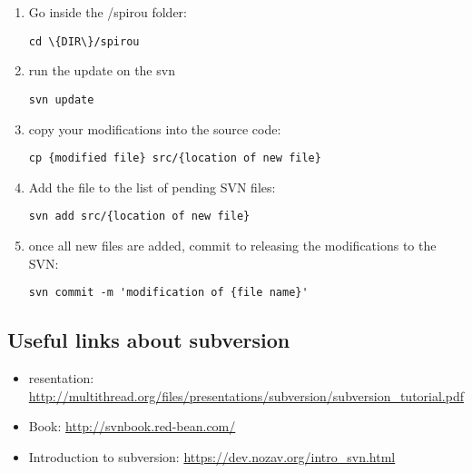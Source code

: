 \begin{enumerate}
\item Go inside the /spirou folder:
\begin{lstlisting}[style=bashstyle]
cd \{DIR\}/spirou
\end{lstlisting}

\item run the update on the svn
\begin{lstlisting}[style=bashstyle]
svn update
\end{lstlisting}

\item copy your modifications into the source code:
\begin{lstlisting}[style=bashstyle]
cp {modified file} src/{location of new file}
\end{lstlisting}

\item Add the file to the list of pending SVN files:
\begin{lstlisting}[style=bashstyle]
svn add src/{location of new file}
\end{lstlisting}

\item once all new files are added, commit to releasing the modifications to the SVN:
\begin{lstlisting}[style=bashstyle]
svn commit -m 'modification of {file name}'
\end{lstlisting}

\end{enumerate}

\subsection{Useful links about subversion}
\label{section:useful-links}

\begin{itemize}
\item resentation: \url{http://multithread.org/files/presentations/subversion/subversion_tutorial.pdf}
\item Book: \url{http://svnbook.red-bean.com/}
\item Introduction to subversion: \url{https://dev.nozav.org/intro_svn.html}
\end{itemize}